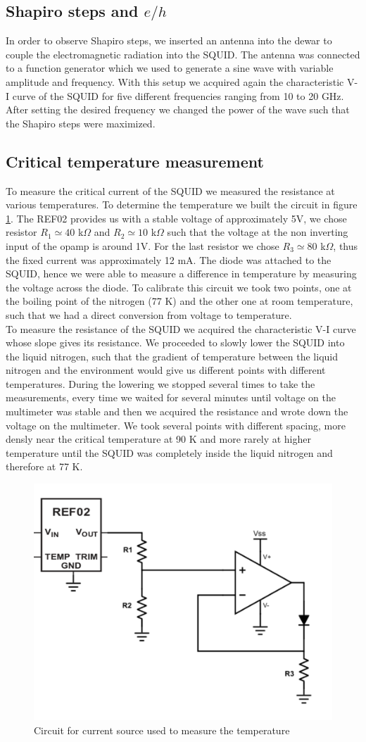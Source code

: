 \documentclass[a4paper,10pt]{article}
\begin{document}
\subsection{Shapiro steps and $e/h$}
In order to observe Shapiro steps, we inserted an antenna into the dewar to couple the electromagnetic radiation into the SQUID. The antenna was connected to a function generator which we used to generate a sine wave with variable amplitude and frequency. With this setup we acquired again the characteristic V-I curve of the SQUID for five different frequencies ranging from 10 to 20 GHz. After setting the desired frequency we changed the power of the wave such that the Shapiro steps were maximized.
\subsection{Critical temperature measurement}
To measure the critical current of the SQUID we measured the resistance at various temperatures. To determine the temperature we built the circuit in figure \ref{circuit}. The REF02 provides us with a stable voltage of approximately 5V, we chose resistor $R_1 \simeq 40$ k$\Omega$ and $R_2 \simeq 10$ k$\Omega$ such that the voltage at the non inverting input of the opamp is around 1V. For the last resistor  we chose $R_3 \simeq 80$ k$\Omega$, thus the fixed current was approximately 12 mA. The diode was attached to the SQUID, hence we were able to measure a difference in temperature by measuring the voltage across the diode. To calibrate this circuit we took two points, one at the boiling point of the nitrogen (77 K) and the other one at room temperature, such that we had a direct conversion from voltage to temperature.\\
To measure the resistance of the SQUID we acquired the characteristic V-I curve whose slope gives its resistance. We proceeded to slowly lower the SQUID into the liquid nitrogen, such that the gradient of temperature between the liquid nitrogen and the environment would give us different points with different temperatures. During the lowering we stopped several times to take the measurements, every time we waited for several minutes until voltage on the multimeter was stable and then we acquired the resistance and wrote down the voltage on the multimeter.
We took several points with different spacing, more densly near the critical temperature at 90 K and more rarely at higher temperature until the SQUID was completely inside the liquid nitrogen and therefore at 77 K.
\begin{figure}[H]
\centering
\includegraphics[width = .5\textwidth]{circuit}
\caption{Circuit for current source used to measure the temperature}\label{circuit}
\end{figure}
\end{document}
